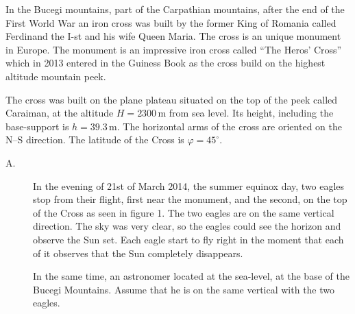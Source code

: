 In the Bucegi mountains, part of the Carpathian mountains, after the end of
the First World War an iron cross was built by the former King of Romania
called Ferdinand the I-st and his wife Queen Maria. The cross is an unique
monument in Europe. The monument is an impressive iron cross called ``The
Heros' Cross'' which in 2013 entered in the Guiness Book as the cross build on
the highest altitude mountain peek.

The cross was built on the plane plateau situated on the top of the peek
called Caraiman, at the altitude $H = 2300$\,m from sea level. Its height,
including the base-support is $h = 39.3$\,m. The horizontal arms of the cross
are oriented on the N--S direction. The latitude of the Cross is
$\varphi = 45^\circ$.

\begin{description}
\item[A.] In the evening of 21st of March 2014, the summer equinox day, two
  eagles stop from their flight, first near the monument, and the second, on
  the top of the Cross as seen in figure 1. The two eagles are on the same
  vertical direction. The sky was very clear, so the eagles could see the
  horizon and observe the Sun set. Each eagle start to fly right in the moment
  that each of it observes that the Sun completely disappears.

  In the same time, an astronomer located at the sea-level, at the base of the
  Bucegi Mountains. Assume that he is on the same vertical with the two
  eagles.



\end{description}
